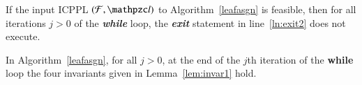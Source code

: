 \documentclass[MS,]{iitmdiss}
\begin{document}
\begin{lemma}
  \label{lem:xnotempty}
  If the input ICPPL $(\cF, \cl)$ to Algorithm~\ref{leafasgn} is
  feasible, then for all iterations $j > 0$ of the {\em \bf while}
  loop, the {\em \bf exit} statement in line~\ref{ln:exit2} does not
  execute.
\end{lemma}

\begin{lemma}
  \label{lem:invar3}
  In Algorithm~\ref{leafasgn}, for all $j > 0$, at the end of the
  $j$th iteration of the {\bf while} loop the four invariants given in
  Lemma~\ref{lem:invar1} hold.
\end{lemma}
\end{document}
